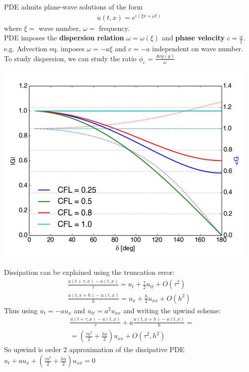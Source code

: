 \documentclass{beamer}
\begin{document}
\begin{frame}
PDE admits plane-wave solutions of the form
\begin{align*}
u(t,x) = e^{\iota(\xi x + \omega t)}
\end{align*}
where $\xi = $ wave number, $\omega = $ frequency. \\
PDE imposes the \textbf{dispersion relation} $\omega = \omega(\xi)$ and \textbf{phase velocity} $c = \frac{\omega}{\xi}$. e.g. Advection eq. imposes $\omega = -a\xi$ and $c = -a$ independent on wave number. \\
To study dispersion, we can study the ratio $\phi_e = \frac{Arg(g)}{\omega}$
\end{frame}
\begin{frame}
\includegraphics[width=\textwidth]{up_g}
\end{frame}
\begin{frame}
Dissipation can be explained using the truncation error:
\begin{align*}
\frac{u(t+\tau,x) - u(t,x)}{\tau} = u_t + \frac{\tau}{2}u_{tt} + O(\tau^2)
\\
\frac{u(t,x + h) - u(t,x)}{h} = u_x + \frac{h}{2}u_{xx} + O(h^2)
\end{align*}
Thus using $u_t = -au_x$ and $u_{tt} = a^2u_{xx}$ and writing the upwind scheme:
\begin{align*}
& \frac{u(t+\tau,x) - u(t,x)}{\tau} + a\frac{u(t,x + h) - u(t,x)}{h} = \\
& = \left(\frac{\tau a^2}{2}+ \frac{ha}{2}\right) u_{xx} + O(\tau^2,h^2) 
\end{align*}
So upwind is order 2 approximation of the dissipative PDE $u_t +au_x + \left(\frac{\tau a^2}{2}+ \frac{ha}{2}\right) u_{xx} = 0$
\end{frame}
\end{document}
